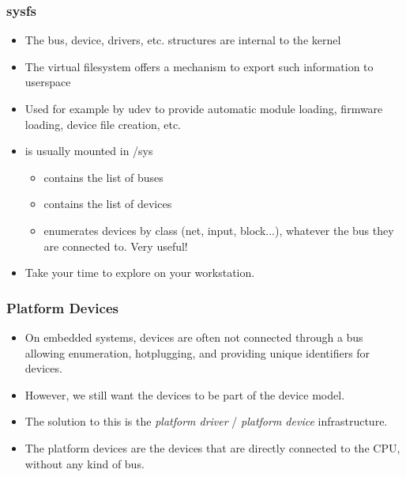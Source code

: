 \begin{frame}
  \frametitle{sysfs}
  \begin{itemize}
  \item The bus, device, drivers, etc. structures are internal to the
    kernel
  \item The  virtual filesystem offers a mechanism to
    export such information to userspace
  \item Used for example by udev to provide automatic module loading,
    firmware loading, device file creation, etc.
  \item {} is usually mounted in /sys
    \begin{itemize}
    \item {} contains the list of buses
    \item {} contains the list of devices
    \item {} enumerates devices by class (net, input,
      block...), whatever the bus they are connected to. Very useful!
    \end{itemize}
  \item Take your time to explore  on your workstation.
  \end{itemize}
\end{frame}

\begin{frame}
  \frametitle{Platform Devices}
  \begin{itemize}
  \item On embedded systems, devices are often not connected through a
    bus allowing enumeration, hotplugging, and providing unique
    identifiers for devices.
  \item However, we still want the devices to be part of the device
    model.
  \item The solution to this is the \emph{platform driver} /
    \emph{platform device} infrastructure.
  \item The platform devices are the devices that are directly
    connected to the CPU, without any kind of bus.
  \end{itemize}
\end{frame}

